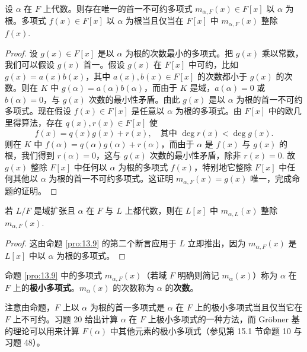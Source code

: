 \begin{proposition}\label{pro:13.9}
设 \(\alpha\) 在 \(F\) 上代数。则存在唯一的首一不可约多项式 \(m_{\alpha,F}(x) \in F[x]\) 以 \(\alpha\) 为根。多项式 \(f(x) \in F[x]\) 以 \(\alpha\) 为根当且仅当在 \(F[x]\) 中 \(m_{\alpha,F}(x)\) 整除 \(f(x)\).
\end{proposition}

\begin{proof}
设 \(g(x) \in F[x]\) 是以 \(\alpha\) 为根的次数最小的多项式。把 \(g(x)\) 乘以常数，我们可以假设 \(g(x)\) 首一。假设 \(g(x)\) 在 \(F[x]\) 中可约，比如 \(g(x) = a(x)b(x)\)，其中 \(a(x), b(x) \in F[x]\) 的次数都小于 \(g(x)\) 的次数。则在 \(K\) 中 \(g(\alpha) = a(\alpha)b(\alpha)\)，而由于 \(K\) 是域，\(a(\alpha) = 0\) 或 \(b(\alpha) = 0\)，与 \(g(x)\) 次数的最小性矛盾。由此 \(g(x)\) 是以 \(\alpha\) 为根的首一不可约多项式。现在假设 \(f(x) \in F[x]\) 是任意以 \(\alpha\) 为根的多项式。由 \(F[x]\) 中的欧几里得算法，存在 \(q(x), r(x) \in F[x]\) 使
\[
f(x) = q(x)g(x)+r(x), \quad \text{其中 } \deg r(x) < \deg g(x).
\]
则在 \(K\) 中 \(f(\alpha) = q(\alpha)g(\alpha)+r(\alpha)\)，而由于 \(\alpha\) 是 \(f(x)\) 与 \(g(x)\) 的根，我们得到 \(r(\alpha) = 0\)，这与 \(g(x)\) 次数的最小性矛盾，除非 \(r(x) = 0\). 故 \(g(x)\) 整除 \(F[x]\) 中任何以 \(\alpha\) 为根的多项式 \(f(x)\)，特别地它整除 \(F[x]\) 中任何其他以 \(\alpha\) 为根的首一不可约多项式。这证明 \(m_{\alpha,F}(x) = g(x)\) 唯一，完成命题的证明。
\end{proof}

\begin{corollary}\label{cor:13.10}
若 \(L/F\) 是域扩张且 \(\alpha\) 在 \(F\) 与 \(L\) 上都代数，则在 \(L[x]\) 中 \(m_{\alpha,L}(x)\) 整除 \(m_{\alpha,F}(x)\).
\end{corollary}

\begin{proof}
这由命题 \ref{pro:13.9} 的第二个断言应用于 \(L\) 立即推出，因为 \(m_{\alpha,F}(x)\) 是 \(L[x]\) 中以 \(\alpha\) 为根的多项式。
\end{proof}

\begin{definition}
命题 \ref{pro:13.9} 中的多项式 \(m_{\alpha,F}(x)\)（若域 \(F\) 明确则简记 \(m_\alpha(x)\)）称为 \(\alpha\) 在 \(F\) 上的\textbf{极小多项式}。\(m_\alpha(x)\) 的次数称为 \(\alpha\) 的\textbf{次数}。
\end{definition}

注意由命题，\(F\) 上以 \(\alpha\) 为根的首一多项式是 \(\alpha\) 在 \(F\) 上的极小多项式当且仅当它在 \(F\) 上不可约。习题 20 给出计算 \(\alpha\) 在 \(F\) 上极小多项式的一种方法，而 Gröbner 基的理论可以用来计算 \(F(\alpha)\) 中其他元素的极小多项式（参见第 15.1 节命题 10 与习题 48）。

